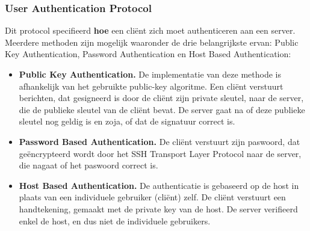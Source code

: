 \documentclass{report}
\begin{document}
	\subsubsection{User Authentication Protocol}
	Dit protocol specifieerd \textbf{hoe} een cliënt zich moet authenticeren aan een server. Meerdere methoden zijn mogelijk waaronder de drie belangrijkste ervan: Public Key Authentication, Password Authentication en Host Based Authentication:
	\begin{itemize}
		\item \textbf{Public Key Authentication.} De implementatie van deze methode is afhankelijk van het gebruikte public-key algoritme. Een cliënt verstuurt berichten, dat gesigneerd is door de cliënt zijn private sleutel, naar de server, die de publieke sleutel van de cliënt bevat. De server gaat na of deze publieke sleutel nog geldig is en zoja, of dat de signatuur correct is. 
		\item \textbf{Password Based Authentication.} De cliënt verstuurt zijn paswoord, dat geëncrypteerd wordt door het SSH Transport Layer Protocol naar de server, die nagaat of het paswoord correct is.
		\item \textbf{Host Based Authentication.} De authenticatie is gebaseerd op de host in plaats van een individuele gebruiker (cliënt) zelf. De cliënt verstuurt een handtekening, gemaakt met de private key van de host. De server verifieerd enkel de host, en dus niet de individuele gebruikers. 
	\end{itemize}
\end{document}
